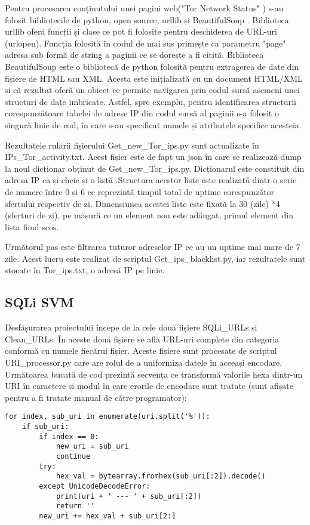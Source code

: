 Pentru procesarea  conținutului unei pagini web("Tor Network Status" \cite{tot_status}) s-au folosit bibliotecile de python, open source, urllib și BeautifulSoup \cite{btf_soup}.  Biblioteca urllib oferă funcții și clase ce pot fi folosite pentru deschiderea de URL-uri (urlopen). Funcția folosită în codul de mai sus primește ca parametru "page" adresa sub formă de string a paginii ce se dorește a fi citită. Biblioteca BeautifulSoup este o bibliotecă de python folosită pentru extragerea de date din fișiere de HTML sau XML. Acesta este inițializată cu un document HTML/XML și că rezultat oferă un obiect ce permite navigarea prin codul sursă asemeni unei structuri de date imbricate. Astfel, spre exemplu, pentru identificarea structurii corespunzătoare tabelei de adrese IP din codul sursă al paginii s-a folosit o singură linie de cod, în care s-au specificat numele și atributele specifice acesteia. 

Rezultatele rulării fișierului  Get\_new\_Tor\_ips.py sunt  actualizate în  IPs\_Tor\_activity.txt.  Acest fișier este de fapt un json în care se realizează dump la noul dicționar obținut de   Get\_new\_Tor\_ips.py.  Dicționarul este constituit din adresa IP ca și cheie și o listă .Structura acestor liste este realizată dintr-o serie de numere între 0 și 6 ce reprezintă timpul total de uptime corespunzător sfertului respectiv de zi. Dimensiunea acestei liste este fixată la 30 (zile) *4 (sferturi de zi), pe măsură ce un element nou este adăugat, primul element din lista fiind scos. 

Următorul pas este filtrarea tuturor adreselor IP ce au un uptime mai mare de 7 zile. Acest lucru este realizat de scriptul  Get\_ips\_blacklist.py, iar rezultatele sunt stocate în Tor\_ips.txt, o adresă IP pe linie. 

\subsection{SQLi SVM}
Desfășurarea proiectului începe de la cele două fișiere SQLi\_URLs si Clean\_URLs.  În aceste două fișiere se află URL-uri complete din categoria conformă cu numele fiecărui fișier. Aceste fișiere sunt procesate de scriptul  URI\_processor.py  care are rolul de a uniformiza datele în aceeași encodare. Următoarea bucată de cod prezintă secvența ce transformă valorile hexa dintr-un URI în caractere și modul în care erorile de encodare sunt tratate (sunt afișate pentru a fi tratate manual de către programator): 

\lstset{language=python,frame=single, showstringspaces=false}
\begin{lstlisting}
for index, sub_uri in enumerate(uri.split('%')):
    if sub_uri:
        if index == 0:
            new_uri = sub_uri
            continue
        try:
            hex_val = bytearray.fromhex(sub_uri[:2]).decode()
        except UnicodeDecodeError:
            print(uri + ' --- ' + sub_uri[:2])
            return ''
        new_uri += hex_val + sub_uri[2:]
\end{lstlisting}


